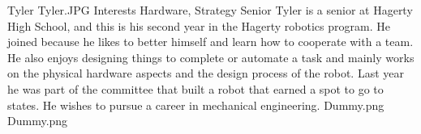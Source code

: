 \insertbio
{Tyler}
{Tyler.JPG}
{Interests}
{Hardware, Strategy}
{Senior}
{  
Tyler is a senior at Hagerty High School, and this is his second year in the Hagerty robotics program. He joined because he likes to better himself and learn how to cooperate with a team. He also enjoys designing things to complete or automate a task and mainly works on the physical hardware aspects and the design process of the robot. Last year he was part of the committee that built a robot that earned a spot to go to states. He wishes to pursue a career in mechanical engineering. 
}
{Dummy.png}
{Dummy.png}
